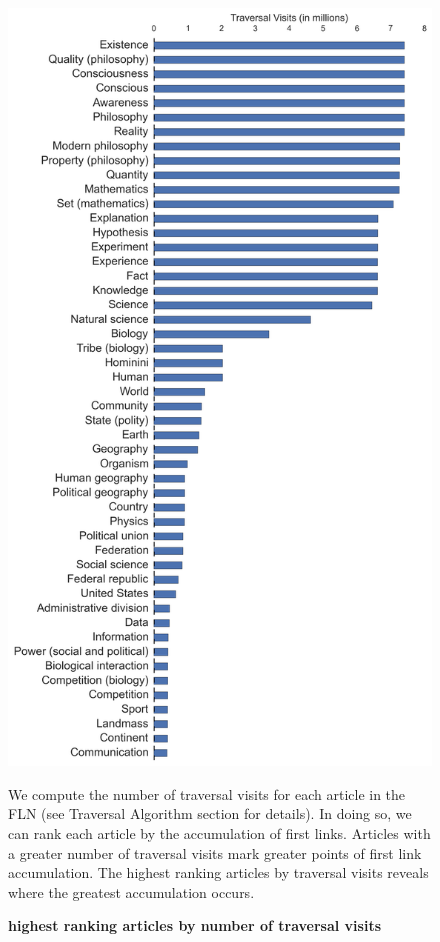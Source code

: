 \documentclass[pre,twocolumn,twoside,superscriptaddress,floatfix, aps, 10pt]{revtex4-1}
\begin{document}
\begin{figure}[tp!]
  \centering	
  \includegraphics[width=\columnwidth]{graphics/articles_ranked.png}
  \caption{
    \textbf{highest ranking articles by number of traversal visits}
  }
  We compute the number of traversal visits for each article in the FLN (see 
  Traversal Algorithm section for details). In doing so, we can rank each article
  by the accumulation of first links. Articles with a greater number of traversal visits
  mark greater points of first link accumulation. The highest ranking articles by traversal visits reveals where the greatest accumulation occurs.
  \label{fig:highest visits}
\end{figure}
\end{document}
